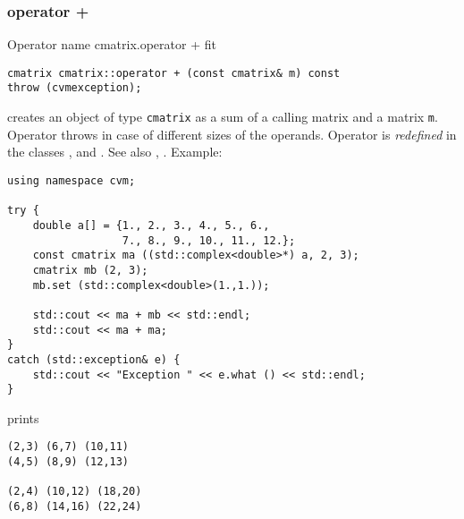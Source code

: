 \subsubsection{operator +}
Operator%
\pdfdest name {cmatrix.operator +} fit
\begin{verbatim}
cmatrix cmatrix::operator + (const cmatrix& m) const
throw (cvmexception);
\end{verbatim}
creates an object of type \verb"cmatrix" as a sum of
a calling  matrix and a matrix \verb"m".
Operator throws  
in case of different sizes of the operands.
Operator is \emph{redefined} in the classes
,  
and .
See also , .
Example:
\begin{Verbatim}
using namespace cvm;

try {
    double a[] = {1., 2., 3., 4., 5., 6.,
                  7., 8., 9., 10., 11., 12.};
    const cmatrix ma ((std::complex<double>*) a, 2, 3);
    cmatrix mb (2, 3);
    mb.set (std::complex<double>(1.,1.));

    std::cout << ma + mb << std::endl;
    std::cout << ma + ma;
}
catch (std::exception& e) {
    std::cout << "Exception " << e.what () << std::endl;
}
\end{Verbatim}
prints
\begin{Verbatim}
(2,3) (6,7) (10,11)
(4,5) (8,9) (12,13)

(2,4) (10,12) (18,20)
(6,8) (14,16) (22,24)
\end{Verbatim}
\newpage



